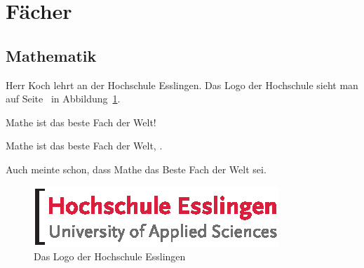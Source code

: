 \section{Fächer}
\subsection{Mathematik}
Herr Koch lehrt an der Hochschule Esslingen.
Das Logo der Hochschule sieht man auf Seite~\pageref{img:he-logo} in Abbildung~\ref{img:he-logo}.

\glqq{}Mathe ist das beste Fach der Welt!\grqq{}~\parencite[S. 18]{kochbuch}

Mathe ist das beste Fach der Welt, \cite[vgl. dazu][S. 20]{kochbuch}.

Auch \textcite{kochbuch} meinte schon, dass Mathe das Beste Fach der Welt sei.

\begin{figure}
    \includegraphics{img/HE_Logo}
    \caption{Das Logo der Hochschule Esslingen}
    \label{img:he-logo} %
\end{figure}